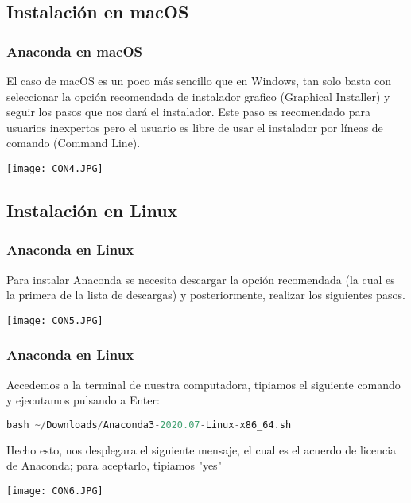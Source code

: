 \documentclass[spanish]{beamer}
\begin{document}
\newpage\subsection{Instalación en macOS}
\begin{frame}\frametitle{Anaconda en macOS}
\setlength{\parskip}{5mm}\justify
El caso de macOS es un poco más sencillo que en Windows, tan solo basta con seleccionar la opción recomendada de instalador grafico (Graphical Installer) y seguir los pasos que nos dará el instalador. Este paso es recomendado para usuarios inexpertos pero el usuario es libre de usar el instalador por líneas de comando (Command Line).

\centering\texttt{[image: CON4.JPG]}

\end{frame}
\newpage\subsection{Instalación en Linux}
\begin{frame}\frametitle{Anaconda en Linux}
\setlength{\parskip}{5mm}\justify
Para instalar Anaconda se necesita descargar la opción recomendada (la cual es la primera de la lista de descargas) y posteriormente, realizar los siguientes pasos. 

\centering\texttt{[image: CON5.JPG]}

\end{frame}
\newpage
\begin{frame}[fragile]\frametitle{Anaconda en Linux}
\setlength{\parskip}{5mm}\justify
Accedemos a la terminal de nuestra computadora, tipiamos el siguiente comando y ejecutamos pulsando a Enter:
\begin{lstlisting}[language=c++]
bash ~/Downloads/Anaconda3-2020.07-Linux-x86_64.sh\end{lstlisting}

Hecho esto, nos desplegara el siguiente mensaje, el cual es el acuerdo de licencia de Anaconda; para aceptarlo, tipiamos "yes"

\centering\texttt{[image: CON6.JPG]}

\end{frame}
\end{document}
